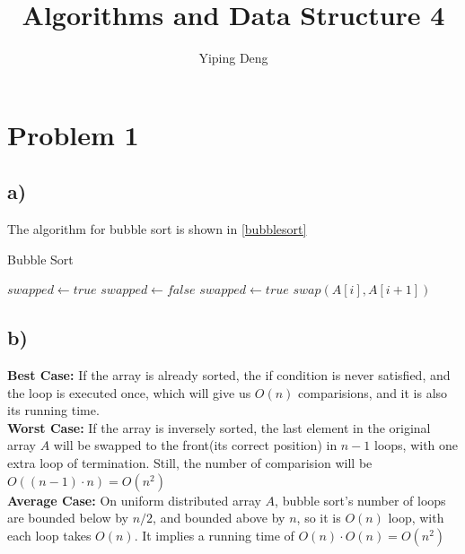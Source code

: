\documentclass{article}
\newcommand{\hwnumber}{4}
\begin{document}
\title{Algorithms and Data Structure \hwnumber}
\author{Yiping Deng}
\maketitle
\thispagestyle{fancy}
\section*{Problem 1}
\subsection*{a)}
The algorithm for bubble sort is shown in \ref{bubblesort}
\begin{algorithm}
    \caption{Bubble Sort}
    \label{bubblesort}
    \begin{algorithmic}[1]
        \State $swapped \gets true$
        \State $swapped \gets false$
        \State $swapped \gets true$
        \State $swap(A[i], A[i + 1])$
        \EndIf
        \EndFor
        \EndWhile
        \EndProcedure
    \end{algorithmic}
\end{algorithm}
\subsection*{b)}
\textbf{Best Case:} If the array is already sorted, the if condition is never satisfied, and the loop
is executed once, which will give us $O(n)$ comparisions, and it is also its running time. \\
\textbf{Worst Case:} If the array is inversely sorted, the last element in the original array $A$
will be swapped to the front(its correct position) in $n - 1$ loops, with one extra loop of termination. Still, the number of comparision
will be $O((n - 1) \cdot n) = O(n^2)$ \\
\textbf{Average Case:} On uniform distributed array $A$, bubble sort's number of loops are bounded
below by $n / 2$, and bounded above by $n$, so it is $O(n)$ loop, with each loop takes $O(n)$. It implies
a running time of $O(n) \cdot O(n) = O(n^2)$
\end{document}
